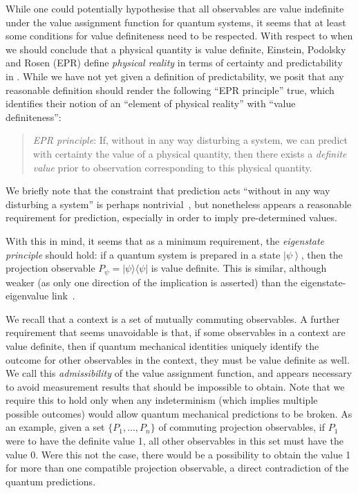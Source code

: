 \documentclass[%
 superscriptaddress,
 preprint,
 showpacs,
 showkeys,
 preprintnumbers,
  amsmath,amssymb,
  aps,
 pra,
  longbibliography,
  floatfix,
 ]{revtex4-1}
\theoremstyle{definition}
\newcommand{\ket}[1]{\left| #1 \right>}
\newcommand{\oprod}[2]{| #1 \rangle\langle #2 |}
\begin{document}
While one could potentially hypothesise that all observables are value indefinite under the value assignment function for quantum systems, it seems that at least some conditions for value definiteness need to be respected.
With respect to
when we should conclude that a physical quantity is value definite,
Einstein, Podolsky and Rosen (EPR)  define {\em physical reality} in terms of certainty and predictability in \cite[p.~777]{epr}.
While we have not yet given a definition of predictability, we posit that any reasonable definition should render
the following  ``EPR principle'' true,
which identifies their notion of an ``element of physical reality'' with ``value definiteness'':
\begin{quote}
	{\em EPR principle}: If, without in any way disturbing a system, we can predict with certainty the value of a physical quantity, then there exists a \emph{definite value} prior to observation corresponding to this physical quantity.
\end{quote}

We briefly note that the constraint that prediction acts ``without in any way disturbing a system'' is perhaps nontrivial~\cite{laloe-2012}, but nonetheless appears a reasonable requirement for prediction, especially in order to imply pre-determined values.

With this in mind, it seems that as a minimum requirement, the \emph{eigenstate principle} should hold: if a quantum system is prepared in a state $\ket{\psi}$, then the projection observable $P_\psi=\oprod{\psi}{\psi}$ is value definite.
This is similar, although weaker (as only one direction of the implication is asserted) than the eigenstate-eigenvalue link~\cite{Suarez:2004gn}.

We recall that a context is a set of mutually commuting observables.
A further requirement that seems unavoidable is that, if some observables in a context are value definite, then if quantum mechanical identities uniquely identify the outcome for other observables in the context, they must be value definite as well.
We call this \emph{admissibility} of the value assignment function, and appears necessary to avoid measurement results that should be impossible to obtain.
Note that we require this to hold only when any indeterminism (which implies multiple possible outcomes) would allow quantum mechanical predictions to be broken.
As an example, given a set $\{P_1,\dots,P_n\}$ of commuting projection observables, if $P_1$ were to have the definite value 1, all other observables in this set must have the value 0.
Were this not the case, there would be a possibility to obtain the value 1 for more than one compatible projection observable, a direct contradiction of the quantum predictions.
\end{document}
